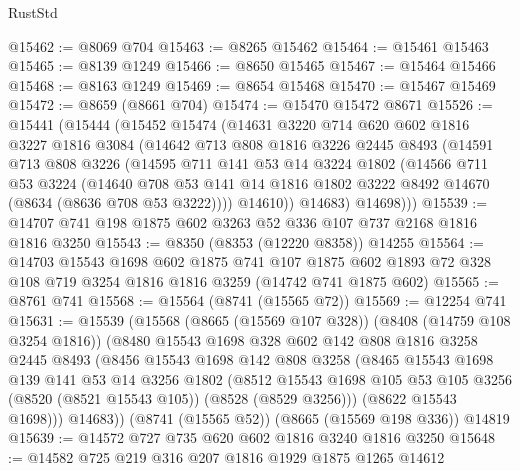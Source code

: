 \begin{lexlean}{RustStd}
\begin{coremodule}
@15462 := @8069 @704
@15463 := @8265 @15462
@15464 := @15461 @15463
@15465 := @8139 @1249
@15466 := @8650 @15465
@15467 := @15464 @15466
@15468 := @8163 @1249
@15469 := @8654 @15468
@15470 := @15467 @15469
@15472 := @8659 (@8661 @704)
@15474 := @15470 @15472 @8671
@15526 := @15441
    (@15444
      (@15452
        @15474
        (@14631
          @3220
          @714
          @620
          @602
          @1816
          @3227
          @1816
          @3084
          (@14642
            @713
            @808
            @1816
            @3226
            @2445
            @8493
            (@14591
              @713
              @808
              @3226
              (@14595
                @711
                @141
                @53
                @14
                @3224
                @1802
                (@14566
                  @711
                  @53
                  @3224
                  (@14640
                    @708
                    @53
                    @141
                    @14
                    @1816
                    @1802
                    @3222
                    @8492
                    @14670
                    (@8634 (@8636 @708 @53 @3222))))
                @14610))
            @14683)
          @14698)))
@15539 := @14707 @741 @198 @1875 @602 @3263 @52 @336 @107 @737 @2168 @1816 @1816 @3250
@15543 := @8350 (@8353 (@12220 @8358)) @14255
@15564 := @14703
    @15543
    @1698
    @602
    @1875
    @741
    @107
    @1875
    @602
    @1893
    @72
    @328
    @108
    @719
    @3254
    @1816
    @1816
    @3259
    (@14742 @741 @1875 @602)
@15565 := @8761 @741
@15568 := @15564 (@8741 (@15565 @72))
@15569 := @12254 @741
@15631 := @15539
    (@15568
      (@8665 (@15569 @107 @328))
      (@8408 (@14759 @108 @3254 @1816))
      (@8480
        @15543
        @1698
        @328
        @602
        @142
        @808
        @1816
        @3258
        @2445
        @8493
        (@8456
          @15543
          @1698
          @142
          @808
          @3258
          (@8465
            @15543
            @1698
            @139
            @141
            @53
            @14
            @3256
            @1802
            (@8512
              @15543
              @1698
              @105
              @53
              @105
              @3256
              (@8520 (@8521 @15543 @105))
              (@8528 (@8529 @3256)))
            (@8622 @15543 @1698)))
        @14683))
    (@8741 (@15565 @52))
    (@8665 (@15569 @198 @336))
    @14819
@15639 := @14572 @727 @735 @620 @602 @1816 @3240 @1816 @3250
@15648 := @14582 @725 @219 @316 @207 @1816 @1929 @1875 @1265 @14612

\end{coremodule}
\end{lexlean}
